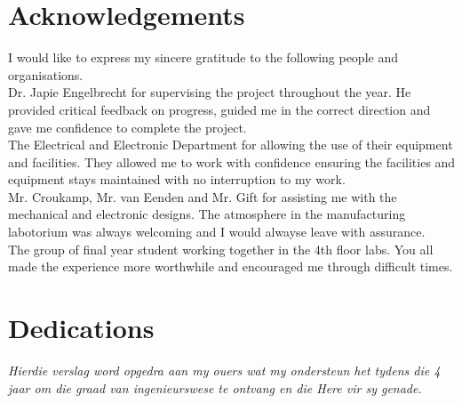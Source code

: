 \begin{abstract}[english]%
In this report a design method for the swinging and balancing  of the underactuated robotic gymnast was researched, simulated and tested on a physical model. The electronic, mechanical and software designs are discussed to show how the physical model was constructed, controllers implemented and data acquired respectively.
\end{abstract}


\begin{abstract}[afrikaans]%
In die projek word die swaaiende en balanseering beheerwette vir 'n robotiese gimnas genavors, ontwerp en getoets op 'n fisiese model. Die eletroniese, meganies en sagteware ontwerpte wat die resultate in the report toegelaat het word bespreek.
\end{abstract}


\chapter{Acknowledgements}%

I would like to express my sincere gratitude to the following people
and organisations.\\

Dr. Japie Engelbrecht for supervising the project throughout the year. He provided critical feedback on progress, guided me in the correct direction and gave me confidence to complete the project.\\

The Electrical and Electronic Department for allowing the use of their equipment and facilities. They allowed me to work with confidence ensuring the facilities and equipment stays maintained with no interruption to my work.\\

Mr$.$ Croukamp, Mr$.$ van Eenden and Mr$.$ Gift for assisting me with the mechanical and electronic designs. The atmosphere in the manufacturing labotorium was always welcoming and I would alwayse leave with assurance.\\

The group of final year student working together in the 4th floor labs. You all made the experience more worthwhile and encouraged me through  difficult times. 




\chapter{Dedications}%
 \vfill
 \begin{Afr}
 \begin{center}\itshape
    Hierdie verslag word opgedra aan my ouers wat my ondersteun het tydens die 4 jaar om die graad van ingenieurswese te ontvang en die Here vir sy genade. 
 \end{center}
 \end{Afr}
 \vfill
 \clearpage

\endinput
